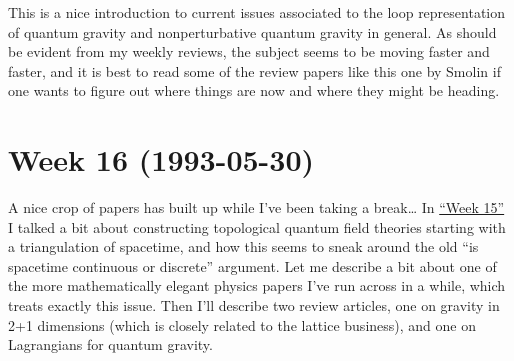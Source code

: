 \documentclass{article}
\def\tightlist{}
\renewcommand{\texttt}[1]{%
  \begingroup
  \ttfamily
  \begingroup\lccode`~=`/\lowercase{\endgroup\def~}{/\discretionary{}{}{}}%
  \begingroup\lccode`~=`[\lowercase{\endgroup\def~}{[\discretionary{}{}{}}%
  \begingroup\lccode`~=`.\lowercase{\endgroup\def~}{.\discretionary{}{}{}}%
  \catcode`/=\active\catcode`[=\active\catcode`.=\active
  \scantokens{#1\noexpand}%
  \endgroup
}
\begin{document}

This is a nice introduction to current issues associated to the loop
representation of quantum gravity and nonperturbative quantum gravity in
general. As should be evident from my weekly reviews, the subject seems
to be moving faster and faster, and it is best to read some of the
review papers like this one by Smolin if one wants to figure out where
things are now and where they might be heading.
\hypertarget{week16}{%
\section{Week 16 (1993-05-30)}\label{week16}}

A nice crop of papers has built up while I've been taking a
break\ldots{} In \protect\hyperlink{week15}{``Week 15''} I talked a bit
about constructing topological quantum field theories starting with a
triangulation of spacetime, and how this seems to sneak around the old
``is spacetime continuous or discrete'' argument. Let me describe a bit
about one of the more mathematically elegant physics papers I've run
across in a while, which treats exactly this issue. Then I'll describe
two review articles, one on gravity in 2+1 dimensions (which is closely
related to the lattice business), and one on Lagrangians for quantum
gravity.

\end{document}
